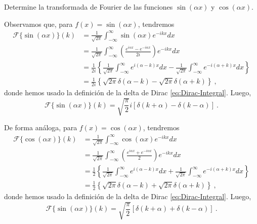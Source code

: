 \begin{ejemplo}
    Determine la transformada de Fourier de las funciones $\sin(\alpha x)$ y $\cos(\alpha x)$.

    Observamos que, para $f(x) = \sin(\alpha x)$, tendremos
    \begin{align*}
        \mathcal{F}\{\sin(\alpha x)\}(k) & = \frac{1}{\sqrt{2\pi}} \int_{-\infty}^\infty \sin(\alpha x) e^{-ikx} dx \\
        & = \frac{1}{\sqrt{2\pi}} \int_{-\infty}^\infty \left( \frac{e^{i\alpha x} - e^{-i\alpha x}}{2i} \right) e^{-ikx} dx \\
        & = \frac{1}{2i} \left\{ \frac{1}{\sqrt{2\pi}} \int_{-\infty}^\infty e^{i(\alpha - k)x} dx - \frac{1}{\sqrt{2\pi}} \int_{-\infty}^\infty e^{-i(\alpha+k)x} dx \right\} \\
        & = \frac{1}{2i} \left\{ \sqrt{2\pi} \delta(\alpha-k) - \sqrt{2\pi} \delta(\alpha+k) \right\} \ , 
    \end{align*}
    donde hemos usado la definición de la delta de Dirac \eqref{eq:Dirac-Integral}. Luego,
    \begin{equation}
        \boxed{\mathcal{F}\{\sin(\alpha x)\}(k) = \sqrt{\frac{\pi}{2}}i[\delta(k+\alpha) - \delta(k-\alpha)] \ .}
    \end{equation}

    De forma análoga, para $f(x) = \cos(\alpha x)$, tendremos
    \begin{align*}
        \mathcal{F}\{\cos(\alpha x)\}(k) & = \frac{1}{\sqrt{2\pi}} \int_{-\infty}^\infty \cos(\alpha x) e^{-ikx} dx \\
        & = \frac{1}{\sqrt{2\pi}} \int_{-\infty}^\infty \left( \frac{e^{i\alpha x} + e^{-i\alpha x}}{2} \right) e^{-ikx} dx \\
        & = \frac{1}{2} \left\{ \frac{1}{\sqrt{2\pi}} \int_{-\infty}^\infty e^{i(\alpha - k)x} dx + \frac{1}{\sqrt{2\pi}} \int_{-\infty}^\infty e^{-i(\alpha+k)x} dx \right\} \\
        & = \frac{1}{2} \left\{ \sqrt{2\pi} \delta(\alpha-k) + \sqrt{2\pi} \delta(\alpha+k) \right\} \ , 
    \end{align*}
    donde hemos usado la definición de la delta de Dirac \eqref{eq:Dirac-Integral}. Luego,
    \begin{equation}
        \boxed{\mathcal{F}\{\sin(\alpha x)\}(k) = \sqrt{\frac{\pi}{2}}[\delta(k+\alpha) + \delta(k-\alpha)] \ .}
    \end{equation}

\end{ejemplo}

